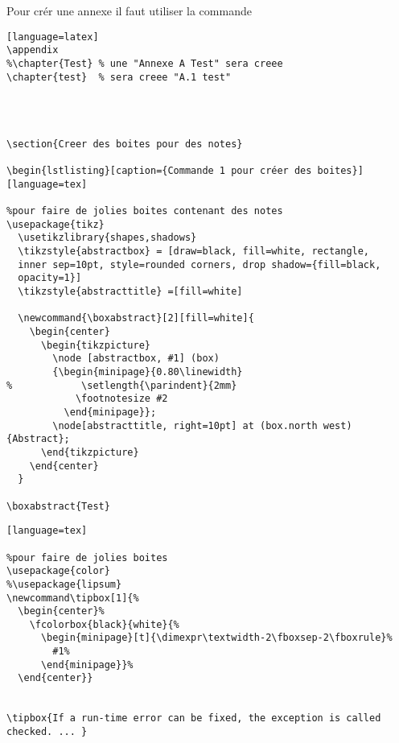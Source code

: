 Pour cr\'er une annexe il faut utiliser la commande
\begin{lstlisting}[caption={Cr\'eer une annexe}] [language=latex]
\appendix		
%\chapter{Test}	% une "Annexe A Test" sera creee
\chapter{test}	% sera creee "A.1 test"




\section{Creer des boites pour des notes}

\begin{lstlisting}[caption={Commande 1 pour créer des boites}] [language=tex]

%pour faire de jolies boites contenant des notes
\usepackage{tikz}
  \usetikzlibrary{shapes,shadows}
  \tikzstyle{abstractbox} = [draw=black, fill=white, rectangle, 
  inner sep=10pt, style=rounded corners, drop shadow={fill=black,
  opacity=1}]
  \tikzstyle{abstracttitle} =[fill=white]
 
  \newcommand{\boxabstract}[2][fill=white]{
    \begin{center}
      \begin{tikzpicture}
        \node [abstractbox, #1] (box)
        {\begin{minipage}{0.80\linewidth}
%            \setlength{\parindent}{2mm}
            \footnotesize #2
          \end{minipage}};
        \node[abstracttitle, right=10pt] at (box.north west) {Abstract};
      \end{tikzpicture}
    \end{center}
  }
  
\boxabstract{Test}
\end{lstlisting}



\begin{lstlisting}[caption={Commande 2 pour créer des boites}] [language=tex]

%pour faire de jolies boites
\usepackage{color}
%\usepackage{lipsum}
\newcommand\tipbox[1]{%
  \begin{center}%
    \fcolorbox{black}{white}{%
      \begin{minipage}[t]{\dimexpr\textwidth-2\fboxsep-2\fboxrule}%
        #1%
      \end{minipage}}%
  \end{center}}
  
  
\tipbox{If a run-time error can be fixed, the exception is called checked. ... }
\end{lstlisting}

